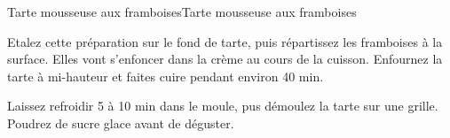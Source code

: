 \begin{recette}{Tarte mousseuse aux framboises}{Tarte mousseuse aux framboises}
\begin{etapes}
\item Etalez cette préparation sur le fond de tarte, puis répartissez les framboises à la surface. Elles vont s’enfoncer dans la crème au cours de la cuisson. Enfournez la tarte à mi-hauteur et faites cuire pendant environ 40 min.
\item Laissez refroidir 5 à 10 min dans le moule, pus démoulez la tarte sur une grille. Poudrez de sucre glace avant de déguster.
\end{etapes}

\end{recette}
